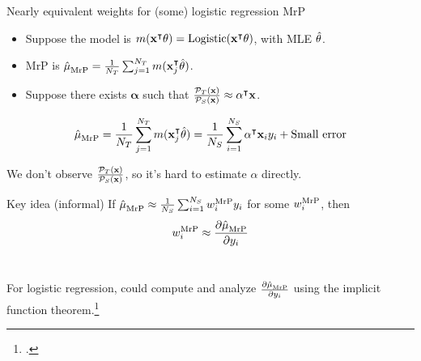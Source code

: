 \begin{frame}[t]{Nearly equivalent weights for (some) logistic regression MrP}

\def\alphav{\mathbf{\alpha}}
%
\begin{itemize}
    \item Suppose the model is $m(\mathbf{x}^\intercal \theta) = \mathrm{Logistic}(\mathbf{x}^\intercal \theta)$, with MLE $\hat{\theta}$.
    \item MrP is $\hat{\mu}^{}_{\mathrm{MrP}} = \frac{1}{{N_T}} \sum_{j=1}^{N_T} m(\mathbf{x}_j^\intercal \hat{\theta})$.
    \item Suppose there exists $\alphav$ such that
            $\frac{\ptar(\x)}{\psur(\x)} \approx \alphav^\trans \x$.
\end{itemize}
$$
\begin{aligned}
\muhat_\mrp =
    \meantar \m(\x_j^\trans \thetahat) ={}
    \meansur \alphav^\trans \x_i \y_i + \textrm{Small error}
\end{aligned}
$$

We don't observe $\frac{{\mathcal{P}_{T}}(\mathbf{x})}{{\mathcal{P}_{S}}(\mathbf{x})}$, so it's hard to estimate $\alpha$
directly.\pause

\begin{block}{Key idea (informal)}
\centering
\vspace{1em}
    If $\hat{\mu}^{}_{\mathrm{MrP}} \approx \frac{1}{{N_S}} \sum_{i=1}^{N_S} w_i^{\mathrm{MrP}} y_i$ for some $w_i^{\mathrm{MrP}}$, then
$$w_i^{\mathrm{MrP}} \approx \frac{\partial \hat{\mu}^{}_{\mathrm{MrP}}}{\partial y_i}$$\\
\vspace{1em}
\end{block}\pause

For logistic regression, could compute and analyze $\frac{\partial \hat{\mu}^{}_{\mathrm{MrP}}}{\partial y_i}$
using the implicit function theorem.\footcite{krantz:2012:implicit,giordano:2019:swiss}

\end{frame}




